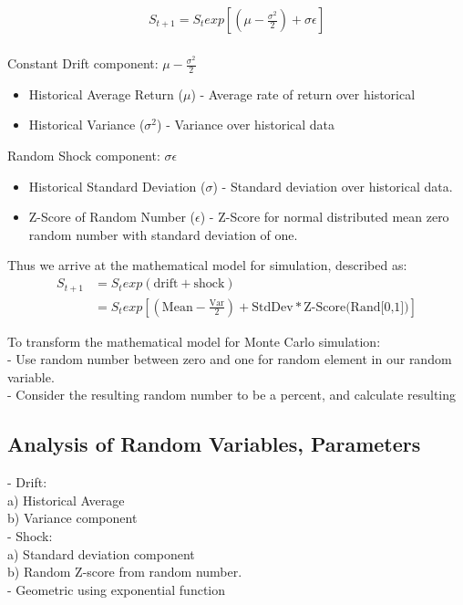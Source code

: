 \documentclass{article}
\begin{document}
\begin{align*}
S_{t+1} = S_{t}exp\left [ \left ( \mu -\frac{\sigma ^{2}}{2} \right ) +\sigma \epsilon \right ] \\
\end{align*}

Constant Drift component: $\mu - \frac{\sigma ^{2}}{2}$
\begin{itemize}
\item Historical Average Return ($\mu$)  - Average rate of return over historical
\item Historical Variance ($\sigma^{2}$) - Variance over historical data
\end{itemize}

Random Shock component: $\sigma \epsilon$
\begin{itemize}
\item Historical Standard Deviation ($\sigma$) - Standard deviation over historical data.
\item Z-Score of Random Number ($\epsilon$) - Z-Score for normal distributed mean zero random number with standard deviation of one.
\end{itemize}

Thus we arrive at the mathematical model for simulation, described as:
\begin{align*}
S_{t+1} &= S_{t}exp( \text{drift} + \text{shock} ) \\
&= S_{t}exp \left [ \left ( \text{Mean} - \frac{\text{Var}}{2} \right ) + \text{StdDev} * \text{Z-Score(Rand[0,1])} \right ]
\end{align*}

To transform the mathematical model for Monte Carlo simulation:\\
- Use random number between zero and one for random element in our random variable.\\
- Consider the resulting random number to be a percent, and calculate resulting

\subsection{Analysis of Random Variables, Parameters}
- Drift:\\
a) Historical Average\\
b) Variance component\\
- Shock:\\
a) Standard deviation component\\
b) Random Z-score from random number.\\
- Geometric using exponential function\\
\end{document}
